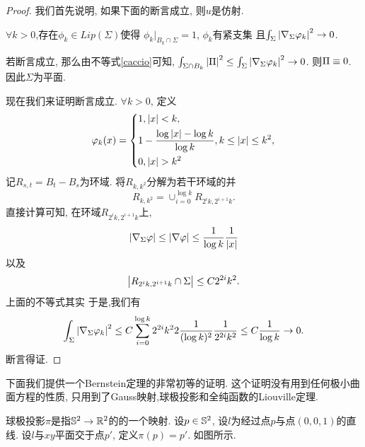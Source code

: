 \begin{proof}
    我们首先说明, 如果下面的断言成立, 则$u$是仿射.
    \begin{claim*}
        $\forall k >0$,存在$\phi_k \in Lip(\Sigma)$使得  $\phi_k|_{B_k \cap \Sigma}=1$, $\phi_k$有紧支集 且$ \int_\Sigma \abs{\nabla_\Sigma \phi_k}^2 \to 0$.
    \end{claim*}
    若断言成立, 那么由不等式\eqref{caccio}可知, $\int_{\Sigma\cap B_k} \abs{\II}^2 \le \int_\Sigma \abs{\nabla_\Sigma \phi_k}^2 \to 0$. 则$\II\eq 0$. 因此$\Sigma$为平面. 
    \par 现在我们来证明断言成立. $\forall k>0$, 定义
    \begin{equation}
        \phi_k(x)=\left\{
            \begin{aligned}
                &1, \abs{x} < k, \\
                &1-\frac{\log\abs{x}-\log k}{\log k}, k \le \abs{x} \le k^2,\\
                &0, \abs{x} > k^2
            \end{aligned}
        \right.
    \end{equation}
    记$R_{s,t}=B_t-B_s$为环域. 将$R_{k,k^2}$分解为若干环域的并 
    \begin{equation}
        R_{k,k^2}=\cup_{i=0}^{\log k} R_{2^ik,2^{i+1}k}.
    \end{equation}
    直接计算可知, 在环域$R_{2^ik,2^{i+1}k}$上,
    \begin{equation}
        \abs{\nabla_\Sigma \phi} \le \abs{\nabla \phi} \le \frac{1}{\log k} \frac{1}{\abs{x}}
    \end{equation}
    以及
    \begin{equation} \label{logp}
        \abs{R_{2^ik,2^{i+1}k} \cap \Sigma } \le C 2^{2i}k^2. 
    \end{equation}
    上面的不等式其实
    于是,我们有
    \begin{equation}
        \int_\Sigma \abs{\nabla_\Sigma \phi_k}^2 \le C\sum_{i=0}^{\log k} 2^{2i}k^22\frac{1}{(\log k)^2} \frac{1}{2^{2i}k^2} \le C\frac{1}{\log k} \to 0.
    \end{equation}
    断言得证.
\end{proof}
下面我们提供一个Bernstein定理的非常初等的证明. 这个证明没有用到任何极小曲面方程的性质, 只用到了Gauss映射,球极投影和全纯函数的Liouville定理.
\begin{definition} \label{stereo}
    球极投影$\pi$是指$\S^2 \to \R^2$的的一个映射. 设$p \in \S^2$, 设$l$为经过点$p$与点$(0,0,1)$的直线. 设$l$与$xy$平面交于点$p'$, 定义$\pi(p)=p'$. 如图所示.
\end{definition}

